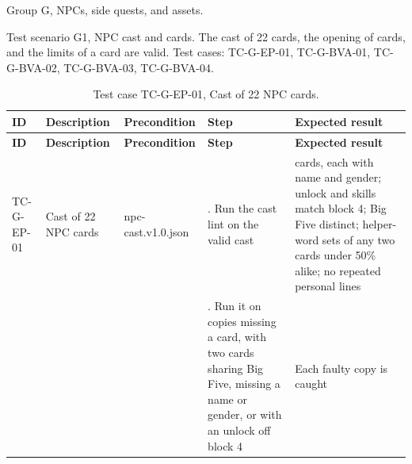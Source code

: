 Group G, NPCs, side quests, and assets.

Test scenario G1, NPC cast and cards. The cast of 22 cards, the opening of cards, and the limits of a card are valid. Test cases: TC-G-EP-01, TC-G-BVA-01, TC-G-BVA-02, TC-G-BVA-03, TC-G-BVA-04.

{\small
\begin{longtable}{|>{\raggedright\arraybackslash}p{}|>{\raggedright\arraybackslash}p{}|>{\raggedright\arraybackslash}p{}|>{\raggedright\arraybackslash}p{}|>{\raggedright\arraybackslash}p{}|}
\caption{Test case TC-G-EP-01, Cast of 22 NPC cards.} \\
\hline
\textbf{ID} & \textbf{Description} & \textbf{Precondition} & \textbf{Step} & \textbf{Expected result} \\ \hline
\endfirsthead
\hline
\textbf{ID} & \textbf{Description} & \textbf{Precondition} & \textbf{Step} & \textbf{Expected result} \\ \hline
\endhead
TC-G-EP-01 & Cast of 22 NPC cards & npc-cast.v1.0.json & 1. Run the cast lint on the valid cast & 22 cards, each with name and gender; unlock and skills match block 4; Big Five distinct; helper-word sets of any two cards under 50\% alike; no repeated personal lines \\ \hline
 &  &  & 2. Run it on copies missing a card, with two cards sharing Big Five, missing a name or gender, or with an unlock off block 4 & Each faulty copy is caught \\ \hline
\end{longtable}
}

